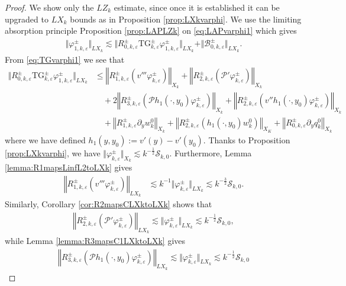 \documentclass[11pt,reqno]{amsproc}
\theoremstyle{definition}
\numberwithin{equation}{section}
\newcommand{\B}{{\mathcal{B}}}
\newcommand{\cS}{{\mathcal S}}
\newcommand{\ep}{\varepsilon}
\renewcommand{\P}{{\mathcal{P}}}
\begin{document}
\begin{proof}We show only the $LZ_k$ estimate, since once it is established it can be upgraded to $LX_k$ bounds as in Proposition \ref{prop:LXkvarphi}. We use the limiting absorption principle Proposition \ref{prop:LAPLZk} on \eqref{eq:LAPvarphi1} which gives
\begin{align*}
\Vert \varphi_{1,k,\ep}^\pm \Vert_{LX_k}\lesssim \Vert R_{0,k,\ep}^\pm\text{TG}_{k,\ep}^\pm\varphi_{1,k,\ep}^\pm \Vert_{LX_k} + \Vert \B_{0,k,\ep}^\pm \Vert_{LX_k}.
\end{align*}
From \eqref{eq:TGvarphi1} we see that
\begin{align*}
\Vert R_{0,k,\ep}^\pm\text{TG}_{k,\ep}^\pm\varphi_{1,k,\ep}^\pm \Vert_{LX_k}  &\leq \left\Vert R_{1,k,\ep}^\pm\left( v'''\varphi_{k,\ep}^\pm \right) \right\Vert_{X_k} + \left\Vert R_{2,k,\ep}^\pm \left(\P'\varphi_{k,\ep}^\pm\right) \right\Vert_{X_k} \\
&\quad + 2 \left\Vert R_{3,k,\ep}^\pm \left( \P h_1(\cdot,y_0) \varphi_{k,\ep}^\pm  \right)  \right\Vert_{X_k}  + \left\Vert R_{2,k,\ep}^\pm \left(v'' h_1(\cdot,y_0)\varphi_{k,\ep}^\pm \right)  \right\Vert_{X_k} \\
&\quad + \left\Vert R_{1,k,\ep}^\pm \partial_y w_k^0 \right\Vert_{X_k} + \left\Vert R_{2,k,\ep}^\pm \left(h_1(\cdot,y_0) w_k^0\right) \right \Vert_{X_K} + \left\Vert R_{0,k,\ep}^\pm \partial_y q_k^0 \right\Vert_{X_k}
\end{align*}
where we have defined $h_1(y,y_0):=v'(y) - v'(y_0)$. Thanks to Proposition \ref{prop:LXkvarphi}, we have $\Vert \varphi_{k,\ep}^\pm \Vert_{X_k}\lesssim k^{-\frac12}\cS_{k,0}$. Furthermore, Lemma \ref{lemma:R1mapsLinfL2toLXk} gives
\begin{align*}
\left\Vert R_{1,k,\ep}^\pm\left( v'''\varphi_{k,\ep}^\pm \right) \right\Vert_{LX_k} &\lesssim k^{-1}\Vert \varphi_{k,\ep}^\pm \Vert_{LX_k} \lesssim k^{-\frac32}\cS_{k,0}.
\end{align*}
Similarly, Corollary \ref{cor:R2mapsCLXktoLXk} shows that
\begin{align*}
\left\Vert R_{2,k,\ep}^\pm \left(\P'\varphi_{k,\ep}^\pm\right) \right\Vert_{LX_k} \lesssim \Vert \varphi_{k,\ep}^\pm \Vert_{LX_k}\lesssim k^{-\frac12}\cS_{k,0},
\end{align*}
while Lemma \ref{lemma:R3mapsC1LXktoLXk} gives
\begin{align*}
\left\Vert R_{3,k,\ep}^\pm \left( \P h_1(\cdot,y_0) \varphi_{k,\ep}^\pm  \right)  \right\Vert_{LX_k} \lesssim \Vert \varphi_{k,\ep}^\pm \Vert_{LX_k}\lesssim k^{-\frac12}\cS_{k,0}

\end{align*}
\end{proof}
\end{document}
